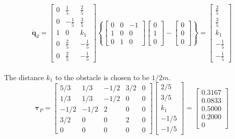 \begin{equation}
    \mathbf{\ddot{q}}_d =
    \begin{bmatrix}
        0 & \frac{1}{5} & \frac{2}{5}\\
        0 & -\frac{1}{5} & \frac{3}{5}\\
        1 & 0 & k_1 \\
        0 & \frac{2}{5} & -\frac{1}{5}\\
        0 & \frac{2}{5} & -\frac{1}{5}
    \end{bmatrix}\left\{
    \begin{bmatrix}
        0 & 0 & -1\\
        1 & 0 & 0\\
        0 & 1 & 0
    \end{bmatrix}
    \begin{bmatrix}
        0\\   1\\   0
    \end{bmatrix}-
    \begin{bmatrix}
        0\\   0\\   0
    \end{bmatrix}\right\}=
    \begin{bmatrix}
        \frac{2}{5}\\
        \frac{3}{5}\\
        k_1 \\
        -\frac{1}{5}\\
        -\frac{1}{5}
    \end{bmatrix}
\end{equation}
\\
The distance $k_1$ to the obstacle is chosen to be $1/2 m$.
\begin{equation}
    \boldsymbol{\tau}_P = 
    \begin{bmatrix}
        5/3 & 1/3 & -1/2 & 3/2 & 0 \\
        1/3 & 1/3 & -1/2 & 0 & 0 \\
        -1/2 & -1/2 & 2 & 0 & 0 \\
        3/2 & 0 & 0 & 2 & 0 \\
        0 & 0 & 0 & 0 & 0 
    \end{bmatrix}
    \begin{bmatrix}
        2/5\\
        3/5\\
        k_1 \\
        -1/5\\
        -1/5
    \end{bmatrix}=
    \begin{bmatrix}
        0.3167\\
        0.0833\\
        0.5000 \\
        0.2000\\
        0
    \end{bmatrix}
\end{equation}

